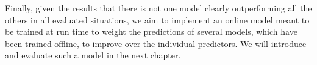 Finally, given the results that there is not one model clearly outperforming all the others in all evaluated situations, we aim to implement an online model meant to be trained at run time to weight the predictions of several models, which have been trained offline, to improve over the individual predictors.
We will introduce and evaluate such a model in the next chapter.

